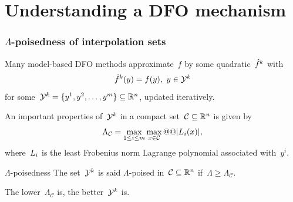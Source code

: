 \documentclass{polyu-presentation}
\newcommand{\iter}[1][]{x\ifthenelse{\equal{#1}{}}{}{^{#1}}}
\newcommand{\lagp}[1][]{L\ifthenelse{\equal{#1}{}}{}{_{#1}}}
\newcommand{\obj}{f}
\newcommand{\objm}[1][]{\hat{f}\ifthenelse{\equal{#1}{}}{}{^{#1}}}
\newcommand{\xpt}[1][]{\mathcal{Y}\ifthenelse{\equal{#1}{}}{}{^{#1}}}
\begin{document}
\section{Understanding a DFO mechanism}

\begin{frame}
    \frametitle{$\Lambda$-poisedness of interpolation sets}
    
    \begin{block}{}
        Many model-based DFO methods \alert{approximate}~$\obj$ by some quadratic~$\objm[k]$ with
        \begin{equation*}
            \objm[k](y) = \obj(y), ~ y \in \xpt[k]
        \end{equation*}
        for some~$\xpt[k] = \set{y^1, y^2, \dots, y^m} \subseteq \R^n$, updated iteratively.
    \end{block}

    An important properties of~$\xpt[k]$ in a compact set~$\mathcal{C} \subseteq \mathbb{R}^n$ is given by
    \begin{equation*}
        \Lambda_{\mathcal{C}} = \max_{1 \le i \le m} \max_{\iter \in \mathcal{C}} @@ \abs{\lagp[i](\iter)},
    \end{equation*}
    where~$\lagp[i]$ is the least Frobenius norm \alert{Lagrange polynomial} associated with~$y^i$.

    \smallskip

    \begin{block}{$\Lambda$-poisedness \parencite{Conn_Scheinberg_Vicente_2009b}}
        The set~$\xpt[k]$ is said \alert{$\Lambda$-poised} in~$\mathcal{C} \subseteq \mathbb{R}^n$ if~$\Lambda \ge \Lambda_{\mathcal{C}}$.
    \end{block}

    The \alert{lower}~$\Lambda_{\mathcal{C}}$ is, the \alert{better}~$\xpt[k]$ is.
\end{frame}
\end{document}
